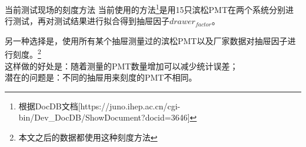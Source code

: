 \documentclass[11pt,compress,xcolor=x11names,UTF8]{beamer}
\begin{document}
\begin{frame}{当前测试现场的刻度方法}
当前使用的方法\footnote{根据DocDB文档[https://juno.ihep.ac.cn/cgi-bin/Dev\_DocDB/ShowDocument?docid=3646]}是用15只滨松PMT在两个系统分别进行测试，再对测试结果进行拟合得到抽屉因子$drawer_{factor}$。

\vspace{.5cm}

另一种选择是，{\color{red}使用所有某个抽屉测量过的滨松PMT以及厂家数据对抽屉因子进行刻度。}\footnote{本文之后的数据都使用这种刻度方法}\\
\vspace{.5cm}
这样做的好处是：随着测量的PMT数量增加可以减少统计误差；\\
潜在的问题是：不同的抽屉用来刻度的PMT不相同。

\end{frame}
%
%
\end{document}
